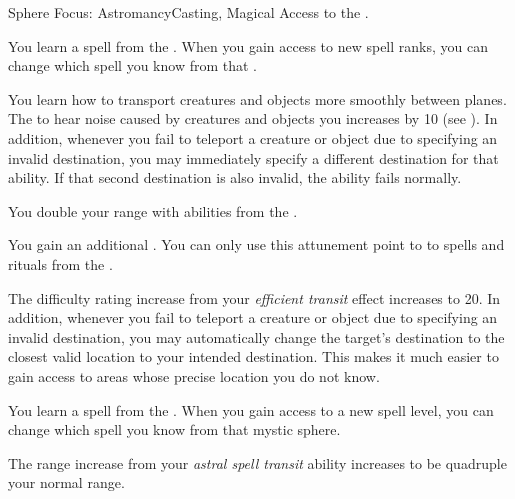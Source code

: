     \begin{feat}{Sphere Focus: Astromancy}{Casting, Magical}
        \featpre Access to the  .

         You learn a spell from the  .
        When you gain access to new spell ranks, you can change which spell you know from that .

         You learn how to transport creatures and objects more smoothly between planes.
        The  to hear noise caused by creatures and objects you  increases by 10 (see ).
        In addition, whenever you fail to teleport a creature or object due to specifying an invalid destination, you may immediately specify a different destination for that ability.
        If that second destination is also invalid, the ability fails normally.

         You double your range with abilities from the  .

         You gain an additional .
        You can only use this attunement point to  to spells and rituals from the  .

         The difficulty rating increase from your \textit{efficient transit} effect increases to 20.
        In addition, whenever you fail to teleport a creature or object due to specifying an invalid destination, you may automatically change the target's destination to the closest valid location to your intended destination.
        This makes it much easier to gain access to areas whose precise location you do not know.

         You learn a spell from the  .
        When you gain access to a new spell level, you can change which spell you know from that mystic sphere.

         The range increase from your \textit{astral spell transit} ability increases to be quadruple your normal range.
    \end{feat}

